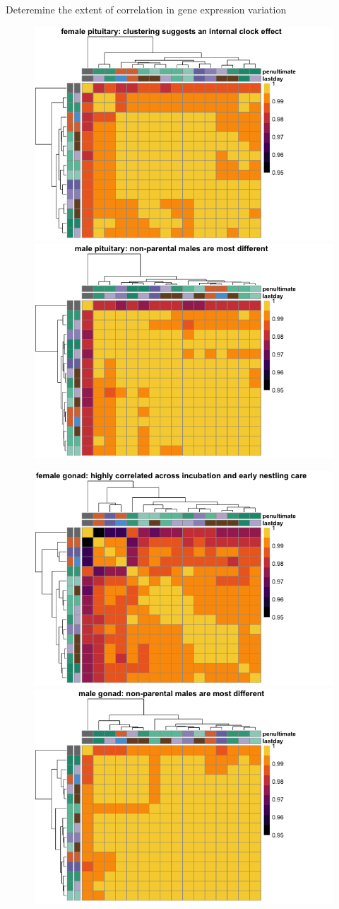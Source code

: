 \documentclass[final]{beamer}
\newlength{\onecolwid}
\newlength{\twocolwid}
\begin{document}
\begin{frame}[t]
\begin{columns}[t]
\begin{column}{\twocolwid}
\begin{columns}[t,totalwidth=\twocolwid]
\begin{column}{\onecolwid}
\begin{block}{{\normalsize Deteremine the extent of correlation in gene expression variation}}
\begin{figure}
\includegraphics[width=0.5\linewidth]{correlationheatmaps-2.png}
\includegraphics[width=0.5\linewidth]{correlationheatmaps-5.png}
\end{figure}


\begin{figure}
\includegraphics[width=0.5\linewidth]{correlationheatmaps-3.png}
\includegraphics[width=0.5\linewidth]{correlationheatmaps-6.png}
\end{figure}

\end{block}


\end{column}
\end{columns}
\end{column}
\end{columns}
\end{frame}
\end{document}
